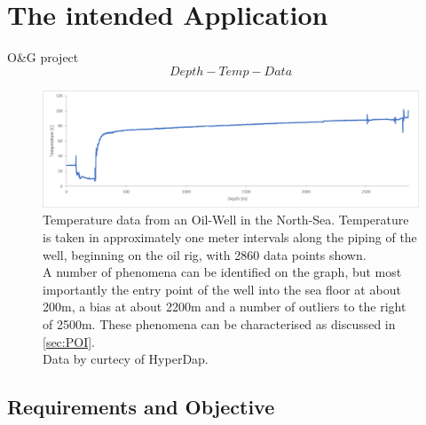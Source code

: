 \documentclass[main.tex]{subfiles}
\begin{document}
    
  \section{The intended Application}
    
    O\&G project
    \[Depth-Temp-Data\]
    \begin{figure}[h]
      \centering
      \includegraphics[width=\linewidth]{figures/wellData}
      \caption{Temperature data from an Oil-Well in the North-Sea. Temperature is taken in approximately one meter intervals along the piping of the well, beginning on the oil rig, with 2860 data points shown. \\
      A number of phenomena can be identified on the graph, but most importantly the entry point of the well into the sea floor at about 200m, a bias at about 2200m and a number of outliers to the right of 2500m. These phenomena can be characterised as discussed in \cref{sec:POI}. \\
      Data by curtecy of HyperDap.}
      \label{fig:well}
    \end{figure}
  
    \subsection{Requirements and Objective}
      
\end{document}

